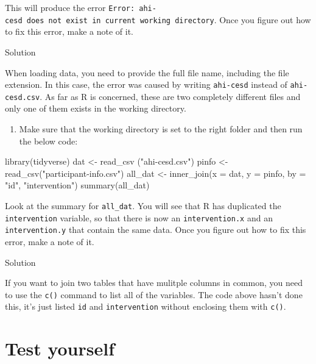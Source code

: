 \documentclass[
  oneside]{book}
\newenvironment{Shaded}{\begin{snugshade}}{\end{snugshade}}
\newcommand{\AttributeTok}[1]{\textcolor[rgb]{0.77,0.63,0.00}{#1}}
\newcommand{\FunctionTok}[1]{\textcolor[rgb]{0.00,0.00,0.00}{#1}}
\newcommand{\NormalTok}[1]{#1}
\newcommand{\OtherTok}[1]{\textcolor[rgb]{0.56,0.35,0.01}{#1}}
\newcommand{\StringTok}[1]{\textcolor[rgb]{0.31,0.60,0.02}{#1}}
\providecommand{\tightlist}{%
  \setlength{\itemsep}{0pt}\setlength{\parskip}{0pt}}
\begin{document}
This will produce the error \texttt{Error:\ \textquotesingle{}ahi-cesd\textquotesingle{}\ does\ not\ exist\ in\ current\ working\ directory}. Once you figure out how to fix this error, make a note of it.

Solution

When loading data, you need to provide the full file name, including the file extension. In this case, the error was caused by writing \texttt{ahi-cesd} instead of \texttt{ahi-cesd.csv}. As far as R is concerned, these are two completely different files and only one of them exists in the working directory.

\begin{enumerate}
\def\labelenumi{\arabic{enumi}.}
\setcounter{enumi}{2}
\tightlist
\item
  Make sure that the working directory is set to the right folder and then run the below code:
\end{enumerate}

\begin{Shaded}
\begin{Highlighting}[]
\FunctionTok{library}\NormalTok{(tidyverse)}
\NormalTok{dat }\OtherTok{\textless{}{-}} \FunctionTok{read\_csv}\NormalTok{ (}\StringTok{"ahi{-}cesd.csv"}\NormalTok{)}
\NormalTok{pinfo }\OtherTok{\textless{}{-}} \FunctionTok{read\_csv}\NormalTok{(}\StringTok{"participant{-}info.csv"}\NormalTok{)}
\NormalTok{all\_dat }\OtherTok{\textless{}{-}} \FunctionTok{inner\_join}\NormalTok{(}\AttributeTok{x =}\NormalTok{ dat, }
                      \AttributeTok{y =}\NormalTok{ pinfo, }
                      \AttributeTok{by =} \StringTok{"id"}\NormalTok{, }\StringTok{"intervention"}\NormalTok{) }
\FunctionTok{summary}\NormalTok{(all\_dat)}
\end{Highlighting}
\end{Shaded}

Look at the summary for \texttt{all\_dat}. You will see that R has duplicated the \texttt{intervention} variable, so that there is now an \texttt{intervention.x} and an \texttt{intervention.y} that contain the same data. Once you figure out how to fix this error, make a note of it.

Solution

If you want to join two tables that have mulitple columns in common, you need to use the \texttt{c()} command to list all of the variables. The code above hasn't done this, it's just listed \texttt{id} and \texttt{intervention} without enclosing them with \texttt{c()}.

\hypertarget{test-yourself}{%
\section{Test yourself}\label{test-yourself}}
\end{document}
